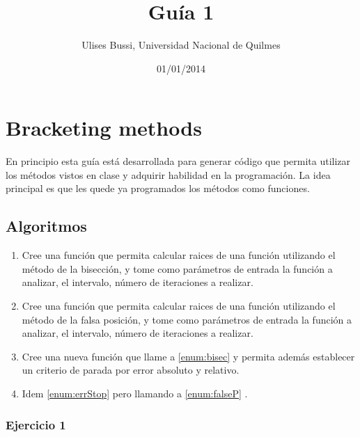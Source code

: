 \documentclass[a4paper,11pt]{article}
\makeatletter
\theoremstyle{mytheor}
\renewcommand{\maketitle}{
\colorbox{gray!20}{\framebox[\linewidth]{ \huge \textsc{\@title} } 
\lfoot{\@title}
}

}
\makeatother
\begin{document}
\title{Guía 1}

\author{Ulises Bussi, Universidad Nacional de Quilmes}

\date{01/01/2014}

\maketitle \vspace{20pt}

\section*{Bracketing methods}
%
En principio esta guía está desarrollada para generar código que permita utilizar los métodos vistos en clase y adquirir habilidad en la programación. La idea principal es que les quede ya programados los métodos como funciones. 





\subsection*{Algoritmos}

\begin{enumerate}[label=\Roman*]

\item \label{enum:bisec} Cree una función que permita calcular raices de una función utilizando el método de la bisección, y tome como parámetros de entrada la función a analizar, el intervalo, número de iteraciones a realizar.

\item \label{enum:falseP} Cree una función que permita calcular raices de una función utilizando el método de la falsa posición, y tome como parámetros de entrada la función a analizar, el intervalo, número de iteraciones a realizar.


\item \label{enum:errStop} Cree una nueva función que llame a \ref{enum:bisec} y permita además establecer un criterio de parada por error absoluto y relativo.

\item Idem \ref{enum:errStop} pero llamando a \ref{enum:falseP} .

\end{enumerate}
\subsubsection*{Ejercicio 1}
\end{document}
